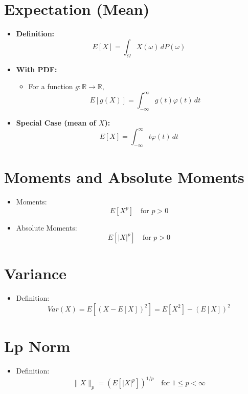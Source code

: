 \documentclass{article}
\begin{document}
\section*{Expectation (Mean)}
\begin{itemize}
    \item \textbf{Definition:}
    \[
    E[X] = \int_{\Omega} X(\omega) \, dP(\omega)
    \]
    
    \item \textbf{With PDF:}
    \begin{itemize}
        \item For a function $g : \mathbb{R} \to \mathbb{R}$,
        \[
        E[g(X)] = \int_{-\infty}^{\infty} g(t) \varphi(t) \, dt
        \]
    \end{itemize}
    
    \item \textbf{Special Case (mean of $X$):}
    \[
    E[X] = \int_{-\infty}^{\infty} t \varphi(t) \, dt
    \]
\end{itemize}




\section*{Moments and Absolute Moments}
\begin{itemize}
    \item Moments: 
    \[
    E[X^p] \quad \text{for } p > 0
    \]
    \item Absolute Moments:
    \[
    E[|X|^p] \quad \text{for } p > 0
    \]
\end{itemize}

\section*{Variance}
\begin{itemize}
    \item Definition:
    \[
    Var(X) = E[(X - E[X])^2] = E[X^2] - (E[X])^2
    \]
\end{itemize}

\section*{Lp Norm}
\begin{itemize}
    \item Definition:
    \[
    \|X\|_p = (E[|X|^p])^{1/p} \quad \text{for } 1 \leq p < \infty
    \]
\end{itemize}
\end{document}
